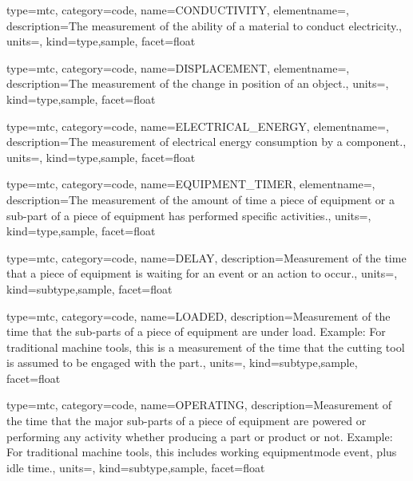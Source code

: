 {
  type=mtc,
  category=code,
  name={CONDUCTIVITY},
  elementname=,
  description={The measurement of the ability of a material to conduct electricity.},
  units=,
  kind={type,sample},
  facet={\gls{float}}
}


{
  type=mtc,
  category=code,
  name={DISPLACEMENT},
  elementname=,
  description={The measurement of the change in position of an object.},
  units=,
  kind={type,sample},
  facet={\gls{float}}
}


{
  type=mtc,
  category=code,
  name={ELECTRICAL\_ENERGY},
  elementname=,
  description={The measurement of electrical energy consumption by a component.},
  units=,
  kind={type,sample},
  facet={\gls{float}}
}


{
  type=mtc,
  category=code,
  name={EQUIPMENT\_TIMER},
  elementname=,
  description={The measurement of the amount of time a piece of equipment or a sub-part of a piece of equipment has performed specific activities.},
  units=,
  kind={type,sample},
  facet={\gls{float}}
}


{
  type=mtc,
  category=code,
  name={DELAY},
  description={Measurement of the time that a piece of equipment is waiting for an event or an action to occur.},
  units=,
  kind={subtype,sample},
  facet={\gls{float}}
}


{
  type=mtc,
  category=code,
  name={LOADED},
  description={Measurement of the time that the sub-parts of a piece of equipment are under load. \newline Example: For traditional machine tools, this is a measurement of the time that the cutting tool is assumed to be engaged with the part.},
  units=,
  kind={subtype,sample},
  facet={\gls{float}}
}


{
  type=mtc,
  category=code,
  name={OPERATING},
  description={Measurement of the time that the major sub-parts of a piece of equipment are powered or performing any activity whether producing a part or product or not.   \newline Example: For traditional machine tools, this includes \gls{working equipmentmode event}, plus idle time.},
  units=,
  kind={subtype,sample},
  facet={\gls{float}}
}


